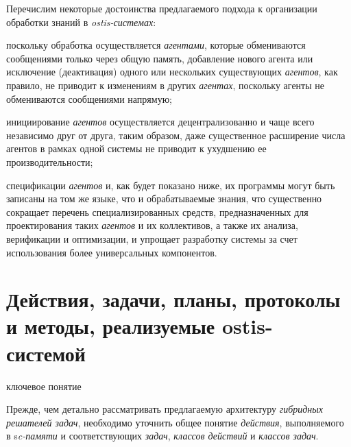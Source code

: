 Перечислим некоторые достоинства предлагаемого подхода к организации обработки знаний в \textit{ostis-системах}:
\begin{textitemize}
	\item поскольку обработка осуществляется \textit{агентами}, которые обмениваются сообщениями только через общую память, добавление нового агента или исключение (деактивация) одного или нескольких существующих \textit{агентов}, как правило, не приводит к изменениям в других \textit{агентах}, поскольку агенты не обмениваются сообщениями напрямую;
	\item инициирование \textit{агентов} осуществляется децентрализованно и чаще всего независимо друг от друга, таким образом, даже существенное расширение числа агентов в рамках одной системы не приводит к ухудшению ее производительности;
	\item спецификации \textit{агентов} и, как будет показано ниже, их программы могут быть записаны на том же языке, что и обрабатываемые знания, что существенно сокращает перечень специализированных средств, предназначенных для проектирования таких \textit{агентов} и их коллективов, а также их анализа, верификации и оптимизации, и упрощает разработку системы за счет использования более универсальных компонентов.
\end{textitemize}

\section{Действия, задачи, планы, протоколы и методы, реализуемые ostis-системой}
\label{sec_ps_actions}

\begin{SCn}
\begin{scnrelfromlist}{ключевое понятие}
\end{scnrelfromlist}
\end{SCn}

Прежде, чем детально рассматривать предлагаемую архитектуру \textit{гибридных решателей задач}, необходимо уточнить общее понятие \textit{действия}, выполняемого в s\textit{c-памяти} и соответствующих \textit{задач}, \textit{классов действий} и \textit{классов задач}.

\begin{SCn}
\end{SCn}

